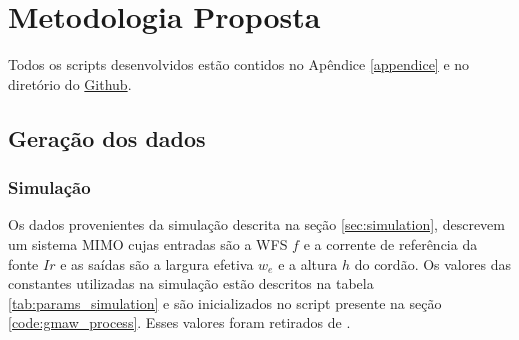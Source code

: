 \chapter{Metodologia Proposta}
\label{chap3}
Todos os scripts desenvolvidos estão contidos no Apêndice \ref{appendice} e no diretório do  \href{https://github.com/lucascbarbosa/lstm-control-waam}{Github}.
\section{Geração dos dados}
\subsection{Simulação}
Os dados provenientes da simulação descrita na seção \ref{sec:simulation}, descrevem um sistema MIMO cujas entradas são a WFS $f$ e a corrente de referência da fonte $Ir$ e as saídas são a largura efetiva $w_e$ e a altura $h$ do cordão. Os valores das constantes utilizadas na simulação estão descritos na tabela \ref{tab:params_simulation} e são inicializados no script presente na seção \ref{code:gmaw_process}. Esses valores foram retirados de \cite{bendia2021multivariable}.

